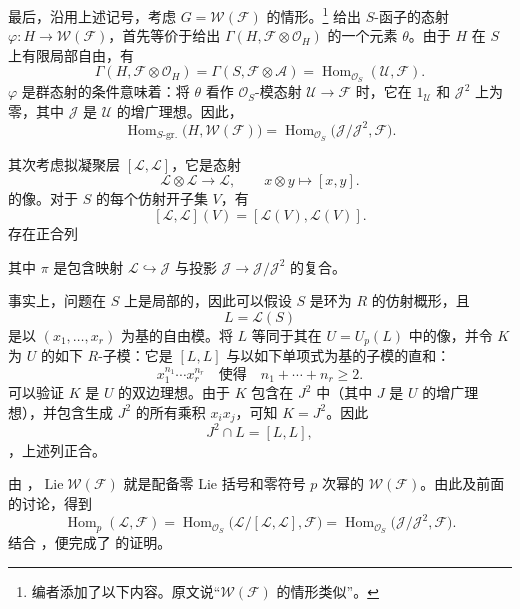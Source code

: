 最后，沿用上述记号，考虑 \(G=\mathcal W(\mathcal F)\) 的情形。\footnote{编者添加了以下内容。原文说“\(\mathcal W(\mathcal F)\) 的情形类似”。}
给出 \(S\)-函子的态射 \(\varphi:H\to\mathcal W(\mathcal F)\)，首先等价于给出 \(\Gamma(H,\mathcal F\otimes\mathcal O_H)\) 的一个元素 \(\theta\)。由于 \(H\) 在 \(S\) 上有限局部自由，有
\[
  \Gamma(H,\mathcal F\otimes\mathcal O_H)
  =
  \Gamma(S,\mathcal F\otimes\mathcal A)
  =
  \operatorname{Hom}_{\mathcal O_S}(\mathcal U,\mathcal F).
\]
\(\varphi\) 是群态射的条件意味着：将 \(\theta\) 看作 \(\mathcal O_S\)-模态射 \(\mathcal U\to\mathcal F\) 时，它在 \(1_{\mathcal U}\) 和 \(\mathcal J^2\) 上为零，其中 \(\mathcal J\) 是 \(\mathcal U\) 的增广理想。因此，
\begin{equation}
  \operatorname{Hom}_{S\text{-gr.}}
    \bigl(H,\mathcal W(\mathcal F)\bigr)
  =
  \operatorname{Hom}_{\mathcal O_S}
    \bigl(\mathcal J/\mathcal J^2,\mathcal F\bigr).
  \tag{1}
  \label{sga3:VIIA:7.2.3-hom-group-additive}
\end{equation}

其次考虑拟凝聚层 \([\mathcal L,\mathcal L]\)，它是态射
\[
  \mathcal L\otimes\mathcal L
  \longrightarrow
  \mathcal L,
  \qquad
  x\otimes y\longmapsto[x,y].
\]
的像。对于 \(S\) 的每个仿射开子集 \(V\)，有
\[
  [\mathcal L,\mathcal L](V)
  =
  [\mathcal L(V),\mathcal L(V)].
\]
存在正合列
\begin{center}
  \label{sga3:VIIA:7.2.3-augmentation-quotient-exact-sequence}
  
\end{center}
其中 \(\pi\) 是包含映射 \(\mathcal L\hookrightarrow\mathcal J\) 与投影 \(\mathcal J\to\mathcal J/\mathcal J^2\) 的复合。

事实上，问题在 \(S\) 上是局部的，因此可以假设 \(S\) 是环为 \(R\) 的仿射概形，且
\[
  L=\mathcal L(S)
\]
是以 \((x_1,\ldots,x_r)\) 为基的自由模。将 \(L\) 等同于其在 \(U=U_p(L)\) 中的像，并令 \(K\) 为 \(U\) 的如下 \(R\)-子模：它是 \([L,L]\) 与以如下单项式为基的子模的直和：
\[
  x_1^{n_1}\cdots x_r^{n_r}
  \quad\text{使得}\quad
  n_1+\cdots+n_r\geq2.
\]
可以验证 \(K\) 是 \(U\) 的双边理想。由于 \(K\) 包含在 \(J^2\) 中（其中 \(J\) 是 \(U\) 的增广理想），并包含生成 \(J^2\) 的所有乘积 \(x_ix_j\)，可知 \(K=J^2\)。因此
\[
  J^2\cap L=[L,L],
\]
，上述列正合。

由 ，\(\operatorname{Lie}\mathcal W(\mathcal F)\) 就是配备零 Lie 括号和零符号 \(p\) 次幂的 \(\mathcal W(\mathcal F)\)。由此及前面的讨论，得到
\begin{equation}
  \operatorname{Hom}_p(\mathcal L,\mathcal F)
  =
  \operatorname{Hom}_{\mathcal O_S}
    \bigl(\mathcal L/[\mathcal L,\mathcal L],\mathcal F\bigr)
  =
  \operatorname{Hom}_{\mathcal O_S}
    \bigl(\mathcal J/\mathcal J^2,\mathcal F\bigr).
  \tag{2}
  \label{sga3:VIIA:7.2.3-hom-p-additive}
\end{equation}
结合 ，便完成了  的证明。

